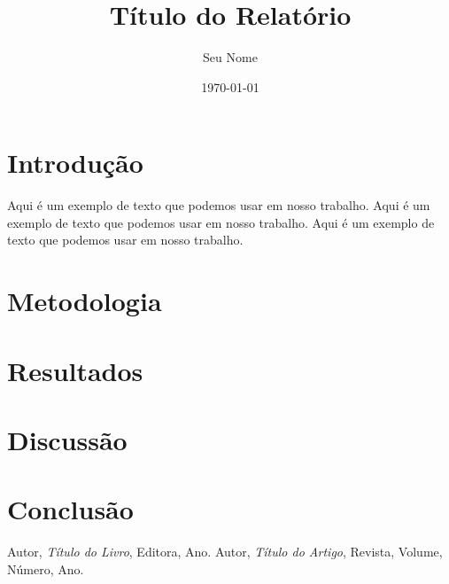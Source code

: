 \documentclass[a4paper,12pt]{report}
\title{Título do Relatório}
\author{Seu Nome}
\date{\today}
\begin{document}
\maketitle
\tableofcontents
\newpage

\chapter{Introdução}
Aqui é um exemplo de texto que podemos usar em nosso trabalho. Aqui é um exemplo de texto que podemos usar em nosso trabalho. Aqui é um exemplo de texto que podemos usar em nosso trabalho.
\lipsum[2-3]

\chapter{Metodologia}
\lipsum[4-5]

\chapter{Resultados}
\lipsum[6-7]

\chapter{Discussão}
\lipsum[8-9]

\chapter{Conclusão}
\lipsum[10]

\begin{thebibliography}{9}
 Autor, \textit{Título do Livro}, Editora, Ano.
 Autor, \textit{Título do Artigo}, Revista, Volume, Número, Ano.
\end{thebibliography}
\end{document}
